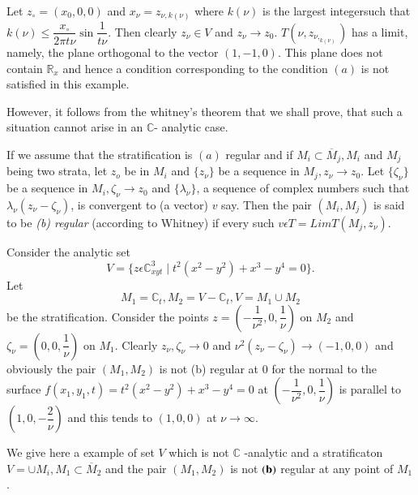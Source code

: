 Let $z_\circ = (x_0,0,0)$ and $x_{\nu} = z_{\nu,k (\nu)}$ where $k(\nu)$
is the largest integer\pageoriginale such that  $k(\nu) \leq
\dfrac{x_\circ}{2 \pi t \nu} \sin \dfrac{1}{t\nu}$. Then clearly $ z_\nu \in V $ and
$z_\nu \rightarrow z_0$. $T(\nu,z_{\nu,_{k(\nu)}})$  has a limit,
namely, the plane  orthogonal to the vector $(1, -1,0)$. This  plane
does not contain  $\mathbb{R}_x$ and hence a condition corresponding
to the condition $(a)$ is not satisfied  in this example. 
 
However, it follows from  the whitney's  theorem that we shall prove,
that such a situation cannot arise in an  $\mathbb{C}$- analytic
case. 
 
If we assume that the stratification is $(a)$ regular and if $M_i
\subset \overline{M}_j, M_i$ and $M_j$ being  two strata, let $z_o$ be
in $M_i$ and $\{z_\nu\}$ be a sequence in $M_j, z_\nu \rightarrow z_0
$. Let $\{\zeta_\nu\}$ be a sequence in $M_i, \zeta_\nu \rightarrow
z_0$ and $\{\lambda_\nu\}$, a sequence of complex numbers such that
$\lambda_\nu(z_\nu -\zeta_\nu)$, is convergent to (a vector) $v$
say. Then the pair  $(M_i,M_j)$ is said to be \textit{(b) regular}
(according to  Whitney) if every such  $v \epsilon T = Lim T
(M_j,z_\nu)$. 

\begin{example}[Whitney]\label{chap1-exam4}  %
  Consider the analytic set
  $$ 
  V = \{z \epsilon \mathbb{C}^{3}_{xyt} \mid t^2 (x^2-y^2)
  +x^3-y^4=0\}.
$$
Let
$$
M_1=\mathbb{C}_t,M_2=V-\mathbb{C}_t, V = M_1
  \cup M_2
$$
  be the stratification. Consider the points $z= \left(-\dfrac{1}{\nu^2},0,
  \dfrac{1}{\nu}\right)$ on $M_2$  and  $\zeta_\nu =
  \left(0,0,\dfrac{1}{\nu}\right)$ on $M_1$.  Clearly $ z_\nu,  \zeta_\nu
  \rightarrow  0$ and  $\nu ^2 (z_\nu- \zeta_\nu) \rightarrow
  (-1,0,0)$ and obviously the pair $(M_1, M_2)$ is not (b) regular at
  $0$ for the normal to the surface  $f(x_1,y_1,t)= t^2(x^2-y^2) +
  x^3-y^4 =0$ at $\left(-\dfrac{1}{\nu^2},0,  \dfrac{1}{\nu}\right)$ is parallel
  to $\left(1,0,- \dfrac{2}{\nu}\right)$ and this tends to  $(1,0,0)$ at $\nu
  \rightarrow \infty$. 
\end{example} 

We give here a example of set $V$ which is not $\mathbb{C}$ -analytic
and a stratificaton $V = \cup M_i,M_1 \subset \overline{M}_2$ and the
pair $(M_1,M_2)$ is not ${\bf (b)}$ regular at any point of $M_1$.  

